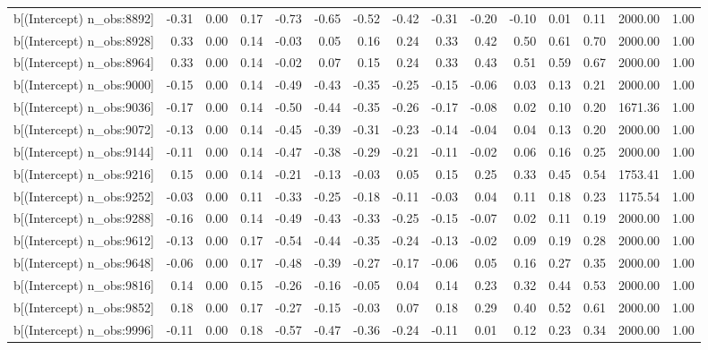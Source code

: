\begin{table}[ht]
\begin{tabular}{rrrrrrrrrrrrrrr}
  b[(Intercept) n\_obs:8892] & -0.31 & 0.00 & 0.17 & -0.73 & -0.65 & -0.52 & -0.42 & -0.31 & -0.20 & -0.10 & 0.01 & 0.11 & 2000.00 & 1.00 \\ 
  b[(Intercept) n\_obs:8928] & 0.33 & 0.00 & 0.14 & -0.03 & 0.05 & 0.16 & 0.24 & 0.33 & 0.42 & 0.50 & 0.61 & 0.70 & 2000.00 & 1.00 \\ 
  b[(Intercept) n\_obs:8964] & 0.33 & 0.00 & 0.14 & -0.02 & 0.07 & 0.15 & 0.24 & 0.33 & 0.43 & 0.51 & 0.59 & 0.67 & 2000.00 & 1.00 \\ 
  b[(Intercept) n\_obs:9000] & -0.15 & 0.00 & 0.14 & -0.49 & -0.43 & -0.35 & -0.25 & -0.15 & -0.06 & 0.03 & 0.13 & 0.21 & 2000.00 & 1.00 \\ 
  b[(Intercept) n\_obs:9036] & -0.17 & 0.00 & 0.14 & -0.50 & -0.44 & -0.35 & -0.26 & -0.17 & -0.08 & 0.02 & 0.10 & 0.20 & 1671.36 & 1.00 \\ 
  b[(Intercept) n\_obs:9072] & -0.13 & 0.00 & 0.14 & -0.45 & -0.39 & -0.31 & -0.23 & -0.14 & -0.04 & 0.04 & 0.13 & 0.20 & 2000.00 & 1.00 \\ 
  b[(Intercept) n\_obs:9144] & -0.11 & 0.00 & 0.14 & -0.47 & -0.38 & -0.29 & -0.21 & -0.11 & -0.02 & 0.06 & 0.16 & 0.25 & 2000.00 & 1.00 \\ 
  b[(Intercept) n\_obs:9216] & 0.15 & 0.00 & 0.14 & -0.21 & -0.13 & -0.03 & 0.05 & 0.15 & 0.25 & 0.33 & 0.45 & 0.54 & 1753.41 & 1.00 \\ 
  b[(Intercept) n\_obs:9252] & -0.03 & 0.00 & 0.11 & -0.33 & -0.25 & -0.18 & -0.11 & -0.03 & 0.04 & 0.11 & 0.18 & 0.23 & 1175.54 & 1.00 \\ 
  b[(Intercept) n\_obs:9288] & -0.16 & 0.00 & 0.14 & -0.49 & -0.43 & -0.33 & -0.25 & -0.15 & -0.07 & 0.02 & 0.11 & 0.19 & 2000.00 & 1.00 \\ 
  b[(Intercept) n\_obs:9612] & -0.13 & 0.00 & 0.17 & -0.54 & -0.44 & -0.35 & -0.24 & -0.13 & -0.02 & 0.09 & 0.19 & 0.28 & 2000.00 & 1.00 \\ 
  b[(Intercept) n\_obs:9648] & -0.06 & 0.00 & 0.17 & -0.48 & -0.39 & -0.27 & -0.17 & -0.06 & 0.05 & 0.16 & 0.27 & 0.35 & 2000.00 & 1.00 \\ 
  b[(Intercept) n\_obs:9816] & 0.14 & 0.00 & 0.15 & -0.26 & -0.16 & -0.05 & 0.04 & 0.14 & 0.23 & 0.32 & 0.44 & 0.53 & 2000.00 & 1.00 \\ 
  b[(Intercept) n\_obs:9852] & 0.18 & 0.00 & 0.17 & -0.27 & -0.15 & -0.03 & 0.07 & 0.18 & 0.29 & 0.40 & 0.52 & 0.61 & 2000.00 & 1.00 \\ 
  b[(Intercept) n\_obs:9996] & -0.11 & 0.00 & 0.18 & -0.57 & -0.47 & -0.36 & -0.24 & -0.11 & 0.01 & 0.12 & 0.23 & 0.34 & 2000.00 & 1.00 \\ 

\end{tabular}
\end{table}
